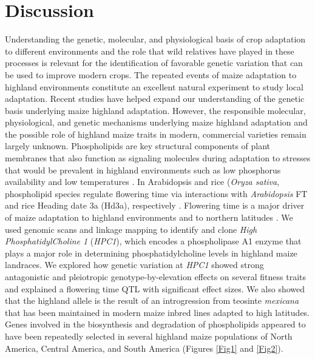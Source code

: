 \documentclass[9pt,twocolumn,twoside,lineno]{biorxiv}
\newcommand{\mex}{\textit{mexicana}\xspace}
\newcommand{\hpc}{\textit{HPC1}\xspace}
\begin{document}
\section{Discussion}
\label{sec:discussion}
Understanding the genetic, molecular, and  physiological basis of crop adaptation to different environments and the role that wild relatives have played in these processes is relevant for the identification of favorable genetic variation that can be used to improve modern crops.
The repeated events of maize adaptation to highland environments constitute an excellent natural experiment to study local adaptation. 
Recent studies \cite{Wang2020-mp, Takuno2015-uj, Crow2020-gene} have helped expand our understanding of the genetic basis underlying maize highland adaptation. 
However, the responsible molecular, physiological, and genetic mechanisms underlying maize highland adaptation and the possible role of highland maize traits in modern, commercial varieties remain largely unknown.
Phospholipids are key structural components of plant membranes that also function as signaling molecules during adaptation to stresses that would be prevalent in highland environments \cite{Ryu2004-iv, Nakamura2017-vb} such as low phosphorus availability \cite{Veneklaas2012-ls, Cruz-Ramirez2004-ib, Lambers2012-an} and low temperatures \cite{Degenkolbe2012-wf, Welti2002-uk, Marla2017-ph}. 
In Arabidopsis and rice (\textit{Oryza sativa}, phospholipid species regulate flowering time via interactions with \textit{Arabidopsis} FT and rice Heading date 3a (Hd3a), respectively \cite{Nakamura2014-qf, Susila2021-dz, Qu2021-wc}. 
Flowering time is a major driver of maize adaptation to highland environments \cite{Romero_Navarro2017-cn, Gates2019-xu, Mercer2019-vj} and to northern latitudes \cite{Hung2012-ms, Swarts2017-ge}.
We used genomic scans and linkage mapping to identify and clone \textit{High PhosphatidylCholine 1} (\hpc), which encodes a phospholipase A1 enzyme that plays a major role in determining phosphatidylcholine levels in highland maize landraces.
We explored how genetic variation at \hpc showed strong antagonistic and pleiotropic genotype-by-elevation effects on several fitness traits and explained a flowering time QTL with significant effect sizes.
We also showed that the highland allele is the result of an introgression from teosinte \mex that has been maintained in modern maize inbred lines adapted to high latitudes.
Genes involved in the biosynthesis and degradation of phospholipids appeared to have been repeatedly selected in several highland maize populations of North America, Central America, and South America (Figures \cref{Fig1} and \cref{Fig2}). 
\end{document}
